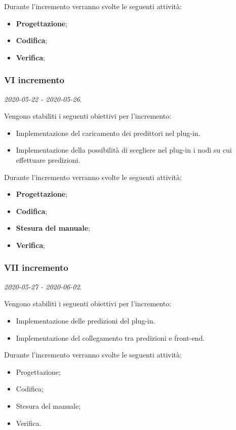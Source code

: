 \documentclass[../piano-di-progetto.tex]{subfiles}
\begin{document}
Durante l'incremento verranno svolte le seguenti attività: 
\begin{itemize}
    \item \textbf{Progettazione};
    \item \textbf{Codifica};
    \item \textbf{Verifica};
\end{itemize}

\subsubsection{VI incremento}
\emph{2020-05-22 - 2020-05-26}. 
 
 Vengono stabiliti i seguenti obiettivi per l'incremento:
 \begin{itemize}
     \item Implementazione del caricamento dei predittori nel plug-in.
     \item Implementazione della possibilità di scegliere nel plug-in i nodi su cui effettuare predizioni.
 \end{itemize}

Durante l'incremento verranno svolte le seguenti attività: 
\begin{itemize}
    \item \textbf{Progettazione};
    \item \textbf{Codifica};
    \item \textbf{Stesura del manuale};
    \item \textbf{Verifica};
\end{itemize}

\subsubsection{VII incremento}
\emph{2020-05-27 - 2020-06-02}. 
 
 Vengono stabiliti i seguenti obiettivi per l'incremento:
 \begin{itemize}
    \item Implementazione delle predizioni del plug-in.
    \item Implementazione del collegamento tra predizioni e front-end.

\end{itemize}

Durante l'incremento verranno svolte le seguenti attività: 
\begin{itemize}
    \item Progettazione;
    \item Codifica;
    \item Stesura del manuale;
    \item Verifica.
\end{itemize}
\end{document}
